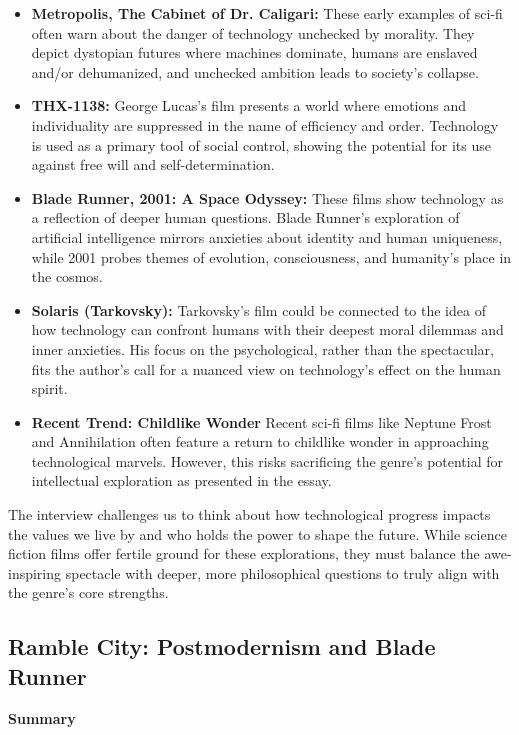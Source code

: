 \documentclass[11pt,fleqn]{book}
\begin{document}
\begin{itemize}
\item \textbf{Metropolis,  The Cabinet of Dr. Caligari:} These early examples of sci-fi often warn about the danger of technology unchecked by morality. They depict dystopian futures where machines dominate, humans are enslaved and/or dehumanized, and unchecked ambition leads to society's collapse.

\item \textbf{THX-1138:}  George Lucas's film presents a world where emotions and individuality are suppressed in the name of efficiency and order.  Technology is used as a primary tool of social control, showing the potential for its use against free will and self-determination.

\item \textbf{Blade Runner, 2001: A Space Odyssey:} These films show technology as a reflection of deeper human questions.  Blade Runner's exploration of artificial intelligence mirrors anxieties about identity and human uniqueness, while 2001 probes themes of evolution, consciousness, and humanity's place in the cosmos. 

\item \textbf{Solaris (Tarkovsky):}  Tarkovsky's film could be connected to the idea of how technology can confront humans with their deepest moral dilemmas and inner anxieties.  His focus on the psychological, rather than the spectacular, fits the author's call for a nuanced view on technology's effect on the human spirit.  

\item \textbf{Recent Trend: Childlike Wonder} Recent sci-fi films like Neptune Frost and Annihilation often feature a return to childlike wonder in approaching technological marvels. However, this risks sacrificing the genre's potential for intellectual exploration as presented in the essay. 
\end{itemize}

\vspace{5pt}

The interview challenges us to think about how technological progress impacts the values we live by and who holds the power to shape the future.  While science fiction films offer fertile ground for these explorations, they must balance the awe-inspiring spectacle with deeper, more philosophical questions to truly align with the genre's core strengths. 


\subsection{Ramble City: Postmodernism and Blade Runner}
\textbf{Summary}
\end{document}
